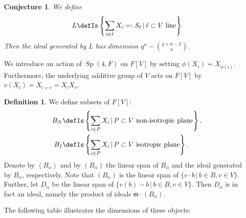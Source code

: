 \documentclass{amsart}
\DeclareMathOperator{\Sp}{Sp}
\theoremstyle{plain}
\newtheorem{conjecture}[theorem]{Conjecture}
\theoremstyle{definition}
\newtheorem{definition}[theorem]{Definition}
\theoremstyle{remark}
\begin{document}
\begin{conjecture} We define
$$
L \defIs  \left\{\sum_{i\in \ell}X_i=:S_\ell \,|\, \ell\subset V \text{ line}\right\}
$$
Then the ideal generated by $L$ has dimension $q^n - \binom{q+n-2}{n}$.
\end{conjecture}


We introduce an action of $\Sp (4,F)$ on $F[V]$ by setting $\phi(X_i) = X_{\phi(i)}$. Furthermore, the underlying additive group of $V$ acts on $F[V]$ by $v( X_i) = X_{i+v} =X_iX_v$. 

\begin{definition} We define subsets of $F[V]$:
\begin{align*}
B_N \defIs   & \left\{\sum_{i\in P}X_i \,|\, P\subset V \text{ non-isotropic plane}\right\}, \\
B_I \defIs  &  \left\{\sum_{i\in P}X_i \,|\, P\subset V \text{ isotropic plane}\right\}.
\end{align*}
Denote by $\left< B_\alpha \right>$ and by $(B_\alpha)$ the linear span of $B_\alpha$ and the ideal generated by $B_\alpha$, respectively. Note that $(B_\alpha) $ is the linear span of $ \{ v\cdot b \,|\, b\in B, v\in V \}$.
Further, let $D_\alpha$ be the linear span of $\{v(b) - b \,|\, b\in B, v\in V \}$. Then $D_\alpha$ is in fact an ideal, namely the product of ideals $\mathfrak m\cdot (B_\alpha)$.
\end{definition}
The following table illustrates the dimensions of these objects:
\vspace{2mm}
\end{document}
